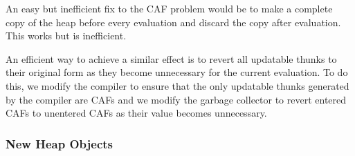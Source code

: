 \documentclass[11pt]{article}
\begin{document}

An easy but inefficient fix to the CAF problem would be to make a
complete copy of the heap before every evaluation and discard the copy
after evaluation.  This works but is inefficient.

An efficient way to achieve a similar effect is to revert all
updatable thunks to their original form as they become unnecessary for
the current evaluation.  To do this, we modify the compiler to ensure
that the only updatable thunks generated by the compiler are CAFs and
we modify the garbage collector to revert entered CAFs to unentered
CAFs as their value becomes unnecessary.


\subsubsection{New Heap Objects}
\end{document}
